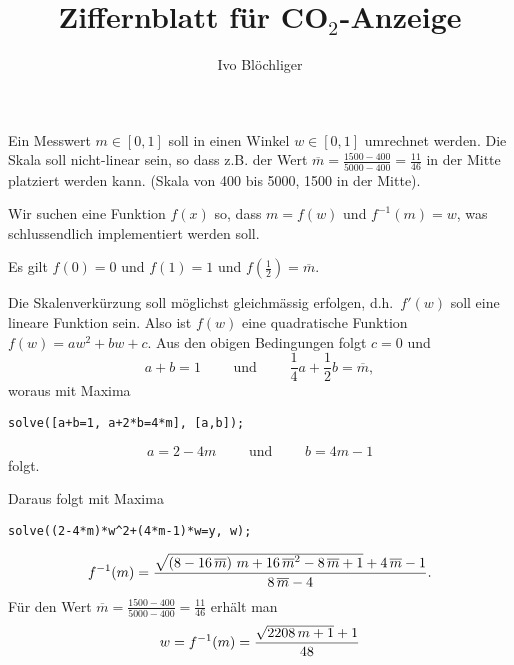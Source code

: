 \documentclass{article}
\title{Ziffernblatt für CO$_2$-Anzeige}
\author{Ivo Blöchliger}
\begin{document}
\maketitle
Ein Messwert $m \in [0,1]$ soll in einen Winkel $w \in [0,1]$
umrechnet werden. Die Skala soll nicht-linear sein, so dass z.B. der
Wert $\overline{m}=\frac{1500-400}{5000-400} = \frac{11}{46}$ in der
Mitte platziert werden kann. (Skala von 400 bis 5000, 1500 in der
Mitte).


Wir suchen eine Funktion $f(x)$ so, dass $m = f(w)$ und $f^{-1}(m)=w$,
was schlussendlich implementiert werden soll.

Es gilt $f(0)=0$ und $f(1)=1$ und $f\left(\frac{1}{2}\right)=\overline{m}$.

Die Skalenverkürzung soll möglichst gleichmässig erfolgen, d.h.\
$f'(w)$ soll eine lineare Funktion sein. Also ist $f(w)$ eine
quadratische Funktion $f(w) = aw^2+bw+c$. Aus den obigen Bedingungen
folgt $c=0$ und
\[
a+b=1 \qquad \text{ und } \qquad \frac{1}{4}a+\frac{1}{2}b =
\overline{m},
\]
woraus mit Maxima
\begin{verbatim}
solve([a+b=1, a+2*b=4*m], [a,b]);
\end{verbatim}
\[
a = 2 - 4 m \qquad \text{ und } \qquad b = 4 m - 1
\]
folgt.

Daraus folgt mit Maxima
\begin{verbatim}
solve((2-4*m)*w^2+(4*m-1)*w=y, w);
\end{verbatim}
\[
f^{-1}(m) = {{\sqrt{\left(8-16\,\overline{m}\right)\,m+16\,\overline{m}^2-8\,\overline{m}+1}+
 4\,\overline{m}-1}\over{8\,\overline{m}-4}}.
\]
Für den Wert $\overline{m}=\frac{1500-400}{5000-400} = \frac{11}{46}$ erhält
man
\[
w = f^{-1}(m) = {{\sqrt{2208\,m+1}+1
  }\over{48}}
\]
\end{document}
